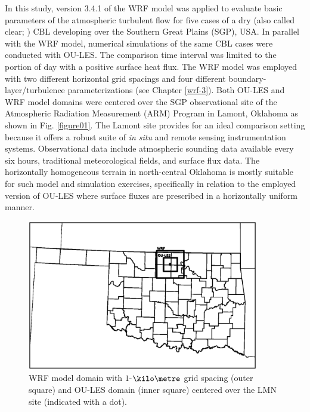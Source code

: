 In this study, version 3.4.1 of the WRF model was applied to evaluate basic parameters of the atmospheric turbulent flow for five cases of a dry (also called clear; \citealt{Holtslag1998}) CBL developing over the Southern Great Plains (SGP), USA. In parallel with the WRF model, numerical simulations of the same CBL cases were conducted with OU-LES. The comparison time interval was limited to the portion of day with a positive surface heat flux. The WRF model was employed with two different horizontal grid spacings and four different boundary-layer\slash turbulence parameterizations (see Chapter \autoref{wrf-3}). Both OU-LES and WRF model domains were centered over the SGP observational site of the Atmospheric Radiation Measurement (ARM) Program in Lamont, Oklahoma as shown in Fig. \autoref{figure01}. The Lamont site provides for an ideal comparison setting because it offers a robust suite of \textit{in situ} and remote sensing instrumentation systems. Observational data include atmospheric sounding data available every six hours, traditional meteorological fields, and surface flux data. The horizontally homogeneous terrain in north-central Oklahoma is mostly suitable for such model and simulation exercises, specifically in relation to the employed version of OU-LES where surface fluxes are prescribed in a horizontally uniform manner.


\begin{figure}[H]
\begin{center}
\includegraphics[width=0.9\textwidth]{figures/chapter4/domains}
\end{center}
\caption{WRF model domain with $1$-$\kilo\metre$ grid spacing (outer square) and OU-LES domain (inner square) centered over the LMN site (indicated with a dot).}
\label{figure01}
\end{figure}


